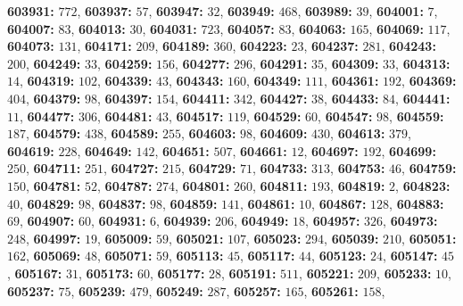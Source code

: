 \textsf{\bfseries 603931:} $772$, \textsf{\bfseries 603937:} $57$, \textsf{\bfseries 603947:} $32$, \textsf{\bfseries 603949:} $468$, \textsf{\bfseries 603989:} $39$, \textsf{\bfseries 604001:} $7$, \textsf{\bfseries 604007:} $83$, \textsf{\bfseries 604013:} $30$, \textsf{\bfseries 604031:} $723$, \textsf{\bfseries 604057:} $83$, \textsf{\bfseries 604063:} $165$, \textsf{\bfseries 604069:} $117$, \textsf{\bfseries 604073:} $131$, \textsf{\bfseries 604171:} $209$, \textsf{\bfseries 604189:} $360$, \textsf{\bfseries 604223:} $23$, \textsf{\bfseries 604237:} $281$, \textsf{\bfseries 604243:} $200$, \textsf{\bfseries 604249:} $33$, \textsf{\bfseries 604259:} $156$, \textsf{\bfseries 604277:} $296$, \textsf{\bfseries 604291:} $35$, \textsf{\bfseries 604309:} $33$, \textsf{\bfseries 604313:} $14$, \textsf{\bfseries 604319:} $102$, \textsf{\bfseries 604339:} $43$, \textsf{\bfseries 604343:} $160$, \textsf{\bfseries 604349:} $111$, \textsf{\bfseries 604361:} $192$, \textsf{\bfseries 604369:} $404$, \textsf{\bfseries 604379:} $98$, \textsf{\bfseries 604397:} $154$, \textsf{\bfseries 604411:} $342$, \textsf{\bfseries 604427:} $38$, \textsf{\bfseries 604433:} $84$, \textsf{\bfseries 604441:} $11$, \textsf{\bfseries 604477:} $306$, \textsf{\bfseries 604481:} $43$, \textsf{\bfseries 604517:} $119$, \textsf{\bfseries 604529:} $60$, \textsf{\bfseries 604547:} $98$, \textsf{\bfseries 604559:} $187$, \textsf{\bfseries 604579:} $438$, \textsf{\bfseries 604589:} $255$, \textsf{\bfseries 604603:} $98$, \textsf{\bfseries 604609:} $430$, \textsf{\bfseries 604613:} $379$, \textsf{\bfseries 604619:} $228$, \textsf{\bfseries 604649:} $142$, \textsf{\bfseries 604651:} $507$, \textsf{\bfseries 604661:} $12$, \textsf{\bfseries 604697:} $192$, \textsf{\bfseries 604699:} $250$, \textsf{\bfseries 604711:} $251$, \textsf{\bfseries 604727:} $215$, \textsf{\bfseries 604729:} $71$, \textsf{\bfseries 604733:} $313$, \textsf{\bfseries 604753:} $46$, \textsf{\bfseries 604759:} $150$, \textsf{\bfseries 604781:} $52$, \textsf{\bfseries 604787:} $274$, \textsf{\bfseries 604801:} $260$, \textsf{\bfseries 604811:} $193$, \textsf{\bfseries 604819:} $2$, \textsf{\bfseries 604823:} $40$, \textsf{\bfseries 604829:} $98$, \textsf{\bfseries 604837:} $98$, \textsf{\bfseries 604859:} $141$, \textsf{\bfseries 604861:} $10$, \textsf{\bfseries 604867:} $128$, \textsf{\bfseries 604883:} $69$, \textsf{\bfseries 604907:} $60$, \textsf{\bfseries 604931:} $6$, \textsf{\bfseries 604939:} $206$, \textsf{\bfseries 604949:} $18$, \textsf{\bfseries 604957:} $326$, \textsf{\bfseries 604973:} $248$, \textsf{\bfseries 604997:} $19$, \textsf{\bfseries 605009:} $59$, \textsf{\bfseries 605021:} $107$, \textsf{\bfseries 605023:} $294$, \textsf{\bfseries 605039:} $210$, \textsf{\bfseries 605051:} $162$, \textsf{\bfseries 605069:} $48$, \textsf{\bfseries 605071:} $59$, \textsf{\bfseries 605113:} $45$, \textsf{\bfseries 605117:} $44$, \textsf{\bfseries 605123:} $24$, \textsf{\bfseries 605147:} $45$, \textsf{\bfseries 605167:} $31$, \textsf{\bfseries 605173:} $60$, \textsf{\bfseries 605177:} $28$, \textsf{\bfseries 605191:} $511$, \textsf{\bfseries 605221:} $209$, \textsf{\bfseries 605233:} $10$, \textsf{\bfseries 605237:} $75$, \textsf{\bfseries 605239:} $479$, \textsf{\bfseries 605249:} $287$, \textsf{\bfseries 605257:} $165$, \textsf{\bfseries 605261:} $158$, 
